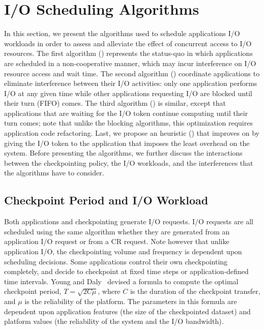 
\section{I/O Scheduling Algorithms}\label{sec:algorithms}

In this section, we present the algorithms used to schedule applications
I/O workloads in order to assess and alleviate the effect of concurrent access
to I/O resources. The first algorithm (\nocoop) represents the status-quo
in which applications are scheduled in a non-cooperative manner, which may
incur interference on I/O resource access and wait time. The second
algorithm (\fifoblock) coordinate applications to eliminate interference
between their I/O activities: only one application performs I/O at any given
time while other applications requesting I/O are blocked until their
turn (FIFO) comes. The third algorithm (\fifononblock) is similar, except
that applications that are waiting for the I/O token
continue computing until their turn comes; note that unlike the
blocking algorithms, this optimization requires
application code refactoring. Last, we propose an heuristic
(\leastwaste) that improves on \fifononblock by giving the I/O token
to the application that imposes the least overhead on the system. Before
presenting the algorithms, we further discuss the interactions between
the checkpointing policy, the I/O workloads, and the interferences that the
algorithms have to consider.


\subsection{Checkpoint Period and I/O Workload}

Both applications and checkpointing generate I/O requests. I/O requests
are all scheduled using the same algorithm whether they
are generated from an application I/O request or from a CR
request. Note however that unlike application I/O, the checkpointing
volume and frequency is dependent upon scheduling decisions.
Some applications
control their own checkpointing completely, and decide to checkpoint at
fixed time steps or application-defined time intervals.
Young and Daly~\cite{young74,daly04} devised a formula to compute the optimal
checkpoint period, $T=\sqrt{2 C \mu}$, where $C$ is the duration of the
checkpoint transfer, and $\mu$ is the reliability of the platform.
The parameters in this formula are dependent upon application features
(the size of the checkpointed dataset) and platform values (the reliability
of the system and the I/O bandwidth).

